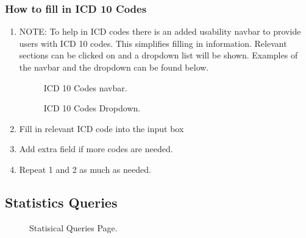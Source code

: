 \documentclass[14pt, a4paper]{article}
\begin{document}
	\subsubsection{How to fill in ICD 10 Codes}
		\begin{enumerate}
			\item NOTE: To help in ICD codes there is an added usability navbar to provide users with ICD 10 codes. This simplifies filling in information. Relevant sections can be clicked on and a dropdown list will be shown. Examples of the navbar and the dropdown can be found below.
			\begin{figure}[H]
				\centerline{}
				\caption{ICD 10 Codes navbar.}
		  		\label{fig:forms2}
			\end{figure}
			\begin{figure}[H]
				\centerline{}
				\caption{ICD 10 Codes Dropdown.}
		  		\label{fig:forms3}
			\end{figure}
			\item Fill in relevant ICD code into the input box
			\item Add extra field if more codes are needed.
			\item Repeat 1 and 2 as much as needed.
		\end{enumerate}
\subsection{Statistics Queries}
	\begin{figure}[H]
		\centerline{}
		\caption{Statisical Queries Page.}
  		\label{fig:statsQ1}
	\end{figure}
\end{document}
